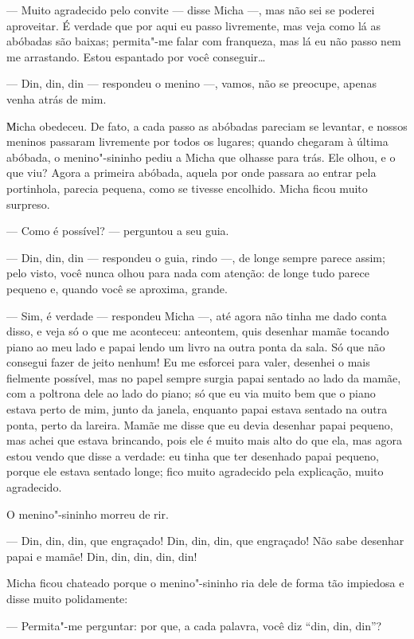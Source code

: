 --- Muito agradecido pelo convite --- disse Micha ---, mas não sei se
poderei aproveitar. É verdade que por aqui eu passo livremente, mas veja como lá as abóbadas são baixas; permita"-me falar com
franqueza, mas lá eu não passo nem me arrastando. Estou espantado por
você conseguir\ldots{}

--- Din, din, din --- respondeu o menino ---, vamos, não se preocupe,
apenas venha atrás de mim.

Мicha obedeceu. De fato, a cada passo as abóbadas pareciam se levantar,
e nossos meninos passaram livremente por todos os lugares; quando
chegaram à última abóbada, o menino"-sininho pediu a Micha que olhasse
para trás. Ele olhou, e o que viu? Agora a primeira abóbada, aquela por
onde passara ao entrar pela portinhola, parecia pequena, como se tivesse
encolhido. Micha ficou muito surpreso.

--- Como é possível? --- perguntou a seu guia.

--- Din, din, din --- respondeu o guia, rindo ---, de longe sempre
parece assim; pelo visto, você nunca olhou para nada com atenção: de
longe tudo parece pequeno e, quando você se aproxima, grande.

--- Sim, é verdade --- respondeu Micha ---, até agora não tinha me dado
conta disso, e veja só o que me aconteceu: anteontem, quis desenhar
mamãe tocando piano ao meu lado e papai lendo um livro na outra ponta da
sala. Só que não consegui fazer de jeito nenhum! Eu me esforcei para
valer, desenhei o mais fielmente possível, mas no papel sempre surgia
papai sentado ao lado da mamãe, com a poltrona dele ao lado do piano; só
que eu via muito bem que o piano estava perto de mim, junto da janela, enquanto papai estava sentado na outra ponta, perto da lareira. Mamãe me disse
que eu devia desenhar papai pequeno, mas achei que estava brincando,
pois ele é muito mais alto do que ela, mas agora estou vendo que disse a
verdade: eu tinha que ter desenhado papai pequeno, porque ele estava sentado
longe; fico muito agradecido pela explicação, muito agradecido.

O menino"-sininho morreu de rir.

--- Din, din, din, que engraçado! Din, din, din, que engraçado! Não sabe
desenhar papai e mamãe! Din, din, din, din, din!

Micha ficou chateado porque o menino"-sininho ria dele de forma tão
impiedosa e disse muito polidamente:

--- Permita"-me perguntar: por que, a cada palavra, você diz ``din, din,
din''?

